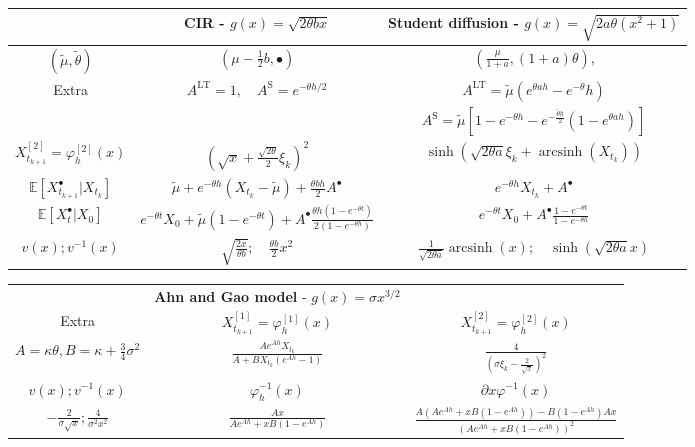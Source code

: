 \documentclass[a4paper,12pt]{article}
\numberwithin{equation}{section}
\theoremstyle{plain}
\theoremstyle{definition}
\begin{document}
\begin{table}
\tiny
    \centering
    \begin{tabular}{ccc}
    \toprule
     & {\bf CIR - $g(x)=\sqrt{2\theta b x}$ } & {\bf Student diffusion  -  $g(x)=\sqrt{2a\theta(x^2+1)}$} \\ \midrule
$(\tilde \mu,\tilde\theta)$ & $(\mu-\frac{1}{2}b, \bullet )$ & $(\frac{\mu}{1+a},(1+a)\theta)$, \\ \midrule
Extra&$A^{\textrm{LT}}=1, \quad A^{\textrm{S}}=e^{-\theta h/2}$&$A^{\textrm{LT}}=\tilde\mu(e^{\theta ah}-e^{-\theta} h)$
    \\
    &&   $A^{\textrm{S}}=\tilde\mu\left[1-e^{-\theta h}-e^{-\frac{\tilde{\theta}h}{2}}(1-e^{\theta ah})\right]$
\\ \midrule
$X^{[2]}_{t_{k+1}}=\varphi^{[2]}_{h}(x)$&$\left(\sqrt{x}+\frac{\sqrt{2\theta}}{2}
\xi_k\right)^2$&$\sinh\left(\sqrt{2\theta a}{\xi_k}+\operatorname{arcsinh}(X_{t_k})\right)$ \\ \midrule
$\mathbb{E}[X^{\bullet}_{t_{k+1}}|X_{t_k}]$&$\tilde{\mu}+e^{-\theta h}\left(X_{t_k}-\tilde{\mu}\right)+\frac{\theta bh}{2}A^{\bullet}$&$e^{-\theta h}X_{t_k}+A^{\bullet}$\\ \midrule
$\mathbb{E}[X^{\bullet}_t|X_{0}]$& $e^{-\theta t}X_0+\tilde{\mu}\left(1-e^{-\theta t}\right)+A^{\bullet}\frac{\theta h(1-e^{-\theta t})}{2(1-e^{-\theta h})}$ &$e^{-\theta t}X_0+A^{\bullet}\frac{1-e^{-\theta t}}{1-e^{-\theta h}}$ \\ \midrule
$v(x); v^{-1}(x)$& $\sqrt{\frac{2x}{\theta b}}; \quad \frac{\theta b}{2}x^2 $&$\frac{1}{\sqrt{2\theta a}}\operatorname{arcsinh}(x); \quad \sinh(\sqrt{2\theta a}x)$\\ \midrule
\bottomrule
    \end{tabular}
\vspace{.5cm}
      \begin{tabular}{ccc}
    \toprule
    & {\bf Ahn and Gao model } - $g(x)=\sigma x^{3/2}$\\
    Extra & $X^{[1]}_{t_{k+1}}=\varphi_h^{[1]}(x)$&$X^{[2]}_{t_{k+1}}=\varphi_h^{[2]}(x)$\\ \midrule
   $A=\kappa \theta,B=\kappa+\frac{3}{4}\sigma^2$& $\frac{Ae^{Ah}X_{t_k}}{A+B X_{t_k}(e^{Ah}-1)}$&$\frac{4}{(\sigma\xi_k-\frac{2}{\sqrt{x}})^2}$\\ \midrule
   $v(x); v^{-1}(x)$& $\varphi_h^{-1}(x)$ &$\partial x\varphi^{-1}(x)$\\ \midrule
   $-\frac{2}{\sigma\sqrt{x}}; \frac{4}{\sigma^2x^2}$&$\frac{Ax}{Ae^{Ah}+xB(1-e^{Ah})}$& $\frac{A(Ae^{Ah}+xB(1-e^{Ah}))-B(1-e^{Ah})Ax}{(Ae^{Ah}+xB(1-e^{Ah}))^2}$\\

\end{tabular}
\end{table}
\end{document}
